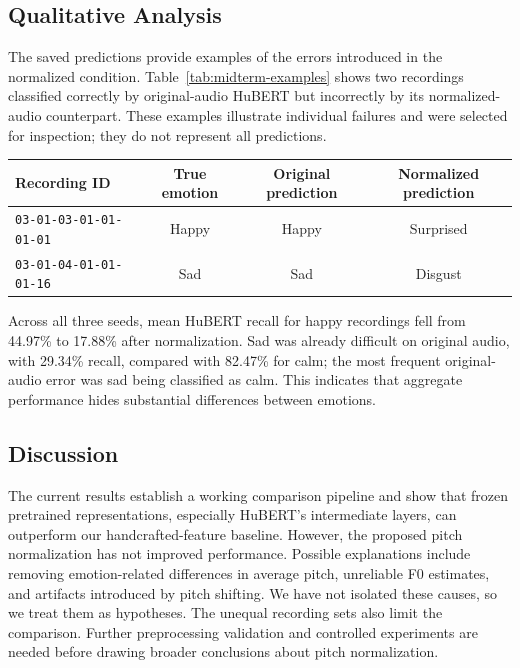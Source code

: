 \subsection{Qualitative Analysis}

The saved predictions provide examples of the errors introduced in the normalized condition. Table~\ref{tab:midterm-examples} shows two recordings classified correctly by original-audio HuBERT but incorrectly by its normalized-audio counterpart. These examples illustrate individual failures and were selected for inspection; they do not represent all predictions.

\begin{center}
\small
\begin{tabular}{lccc}
\toprule
\textbf{Recording ID} & \textbf{True emotion} & \textbf{Original prediction} & \textbf{Normalized prediction} \\
\midrule
\texttt{03-01-03-01-01-01-01} & Happy & Happy & Surprised \\
\texttt{03-01-04-01-01-01-16} & Sad & Sad & Disgust \\
\bottomrule
\end{tabular}
\label{tab:midterm-examples}
\end{center}

Across all three seeds, mean HuBERT recall for happy recordings fell from 44.97\% to 17.88\% after normalization. Sad was already difficult on original audio, with 29.34\% recall, compared with 82.47\% for calm; the most frequent original-audio error was sad being classified as calm. This indicates that aggregate performance hides substantial differences between emotions.

\subsection{Discussion}

The current results establish a working comparison pipeline and show that frozen pretrained representations, especially HuBERT's intermediate layers, can outperform our handcrafted-feature baseline. However, the proposed pitch normalization has not improved performance. Possible explanations include removing emotion-related differences in average pitch, unreliable F0 estimates, and artifacts introduced by pitch shifting. We have not isolated these causes, so we treat them as hypotheses. The unequal recording sets also limit the comparison. Further preprocessing validation and controlled experiments are needed before drawing broader conclusions about pitch normalization.

